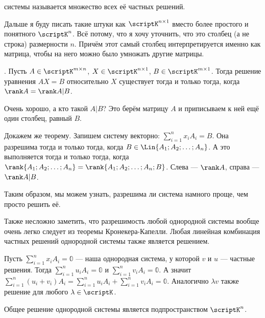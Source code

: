 \documentclass{article}
\begin{document}
\begin{itemize}
        \dfn {} системы называется множество всех её частных решений.
        \begin{Comment}
            Дальше я буду писать такие штуки как $\scriptK^{n\times 1}$ вместо более простого и понятного $\scriptK^n$. Всё потому, что я хочу уточнить, что это столбец (а не строка) размерности $n$. Причём этот самый столбец интерпретируется именно как матрица, чтобы на него можно было умножать другие матрицы.
        \end{Comment}
        \thm {}. Пусть $A\in\scriptK^{m\times n}$, $X\in\scriptK^{n\times 1}$, $B\in\scriptK^{m\times 1}$. Тогда решение уравнения $AX=B$ относительно $X$ существует тогда и только тогда, когда $\rank A=\rank A|B$.
        \begin{Comment}
            Очень хорошо, а кто такой $A|B$? Это берём матрицу $A$ и приписываем к ней ещё один столбец, равный $B$.
        \end{Comment}
        \begin{Proof}
            Докажем же теорему. Запишем систему векторно: $\sum\limits_{i=1}^nx_iA_i=B$. Она разрешима тогда и только тогда, когда $B\in\Lin\{A_1;A_2;\ldots;A_n\}$. А это выполняется тогда и только тогда, когда $\rank\{A_1;A_2;\ldots;A_n\}=\rank\{A_1;A_2;\ldots;A_n;B\}$. Слева --- $\rank A$, справа --- $\rank A|B$.
        \end{Proof}
        \begin{Comment}
            Таким образом, мы можем узнать, разрешима ли система намного проще, чем просто решить её.
        \end{Comment}
        \thm Также несложно заметить, что разрешимость любой однородной системы вообще очень легко следует из теоремы Кронекера-Капелли.
        \thm Любая линейная комбинация частных решений однородной системы также является решением.
        \begin{Proof}
            Пусть $\sum\limits_{i=1}^nx_iA_i=\mathbb0$ --- наша однородная система, у которой $v$ и $u$ --- частные решения. Тогда $\sum\limits_{i=1}^nu_iA_i=\mathbb0$ и $\sum\limits_{i=1}^nv_iA_i=\mathbb0$. А значит $\sum\limits_{i=1}^n(u_i+v_i)A_i=\sum\limits_{i=1}^nu_iA_i+\sum\limits_{i=1}^nv_iA_i=\mathbb0$. Аналогично $\lambda v$ также решение для любого $\lambda\in\scriptK$.
        \end{Proof}
        \thm Общее решение однородной системы является подпространством $\scriptK^n$.
        \begin{Proof}

\end{Proof}
\end{itemize}
\end{document}
